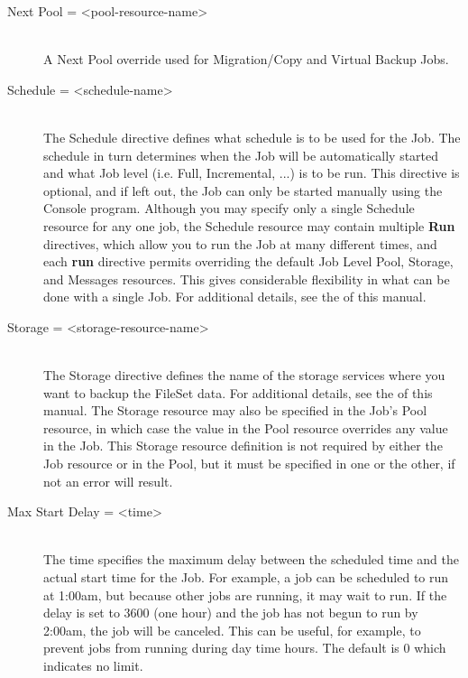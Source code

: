 \begin{description}
\item [Next Pool = {\textless}pool-resource-name{\textgreater}] \hfill \\
A Next Pool override used for Migration/Copy and Virtual Backup Jobs.

\item [Schedule = {\textless}schedule-name{\textgreater}] \hfill \\
The Schedule directive defines what schedule is to be used for the Job.
The schedule in turn determines when the Job will be automatically
started and what Job level (i.e.  Full, Incremental, ...) is to be run.
This directive is optional, and if left out, the Job can only be started
manually using the Console program.  Although you may specify only a
single Schedule resource for any one job, the Schedule resource may
contain multiple {\bf Run} directives, which allow you to run the Job at
many different times, and each {\bf run} directive permits overriding
the default Job Level Pool, Storage, and Messages resources.  This gives
considerable flexibility in what can be done with a single Job.  For
additional details, see the  of this manual.

\item [Storage = {\textless}storage-resource-name{\textgreater}] \hfill \\
The Storage directive defines the name of the storage services where you
want to backup the FileSet data.  For additional details, see the
 of this manual.
The Storage resource may also be specified in the Job's Pool resource,
in which case the value in the Pool resource overrides any value
in the Job. This Storage resource definition is not required by either
the Job resource or in the Pool, but it must be specified in
one or the other, if not an error will result.

\item [Max Start Delay = {\textless}time{\textgreater}] \hfill \\
The time specifies the maximum delay between the scheduled time and the
actual start time for the Job.  For example, a job can be scheduled to
run at 1:00am, but because other jobs are running, it may wait to run.
If the delay is set to 3600 (one hour) and the job has not begun to run
by 2:00am, the job will be canceled.  This can be useful, for example,
to prevent jobs from running during day time hours.  The default is 0
which indicates no limit.


\end{description}

